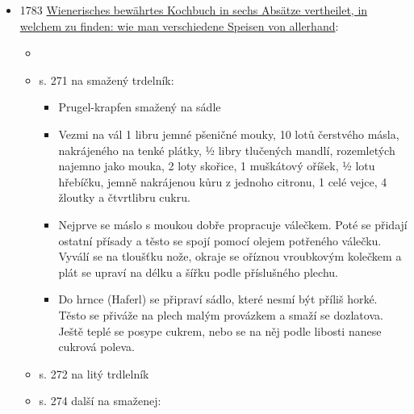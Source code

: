 \begin{itemize}
\begin{itemize}
    \begin{itemize}
    \tightlist
    \item
       na litej trdelník
    \item
      Dadouc dvanácte vajec do hrnce, míchej, kverlůj s nimi dobře, vem
      potom půl pinty smetany a nového másla a vlej to mezi ty vejce,
      míchej tim hodně, vezmi opět pěkné mouky a udělej z toho těsto v
      tom hrnci, aby drobet hustší bylo, nežli obyčejné těsto k strudlím
      bývá, vezmi opět čerstvého másla na pánev, rozpal ho a pokrop s
      nim rožeň, podstav pod rožen pekáč, vezmi potom železnou lžící z
      hrnce toho těsta tři neb čtyry lžíce a polejvej nim rožen,
      obracůj, co dolu na pekáč zteče, to zase na rožen vlej a
      zponenáhla peč, zasejpej květem a zse tim těstem polej, na to zas
      květem zasejpej a tak pokračůj, až všechno těsto vypotřebuješ, pak
      peč až do červena, když pak to dost pečené bude, tehdy to z rožnu
      sejmouc, nes na stůl.
    \end{itemize}
  \end{itemize}
\item
  1783
  \href{https://www.digital.wienbibliothek.at/wbrobv/content/titleinfo/2758260?query=kochbuch}{Wienerisches
  bewährtes Kochbuch in sechs Absätze vertheilet, in welchem zu finden:
  wie man verschiedene Speisen von allerhand}:

  \begin{itemize}
  \tightlist
  \item
     
  \item
    s. 271  na smažený trdelník:

    \begin{itemize}
    \tightlist
    \item
      Prugel-krapfen smažený na sádle
    \item
      Vezmi na vál 1 libru jemné pšeničné mouky, 10 lotů čerstvého
      másla, nakrájeného na tenké plátky, ½ libry tlučených mandlí,
      rozemletých najemno jako mouka, 2 loty skořice, 1 muškátový
      oříšek, ½ lotu hřebíčku, jemně nakrájenou kůru z jednoho citronu,
      1 celé vejce, 4 žloutky a čtvrtlibru cukru.
    \item
      Nejprve se máslo s moukou dobře propracuje válečkem. Poté se
      přidají ostatní přísady a těsto se spojí pomocí olejem potřeného
      válečku. Vyválí se na tloušťku nože, okraje se oříznou vroubkovým
      kolečkem a plát se upraví na délku a šířku podle příslušného
      plechu.
    \item
      Do hrnce (Haferl) se připraví sádlo, které nesmí být příliš horké.
      Těsto se přiváže na plech malým provázkem a smaží se dozlatova.
      Ještě teplé se posype cukrem, nebo se na něj podle libosti nanese
      cukrová poleva.
    \end{itemize}
  \item
    s. 272  na litý trdlelník
  \item
    s. 274 další  na smaženej:


\end{itemize}
\end{itemize}
